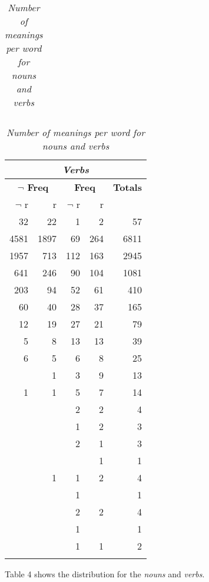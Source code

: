 \begin{table}[htb]
\begin{tabular}{|r||r|r|r|r|r|}
\end{tabular}
\begin{tabular}{r|r|r|r|r|}\hline
 \multicolumn{5}{c|}{\em Verbs}\\ \hline
 \multicolumn{2}{c|}{\bf $\neg$ Freq} &\multicolumn{2}{c|}{\bf Freq}
     & {\bf Totals}\\ \cline{1-4}
 $\neg$ r&      r&$\neg$ r&      r& \\ \hline\hline
   32&     22&      1&      2 &   57\\ \hline
 4581&   1897&     69&    264 & 6811\\ \hline
 1957&    713&    112&    163 & 2945\\ \hline
  641&    246&     90&    104 & 1081\\ \hline
  203&     94&     52&     61 &  410\\ \hline
   60&     40&     28&     37 &  165\\ \hline
   12&     19&     27&     21 &   79\\ \hline
    5&      8&     13&     13 &   39\\ \hline
    6&      5&      6&      8 &   25\\ \hline
     &      1&      3&      9 &   13\\ \hline
    1&      1&      5&      7 &   14\\ \hline
     &       &      2&      2 &    4\\ \hline
     &       &      1&      2 &    3\\ \hline
     &       &      2&      1 &    3\\ \hline
     &       &       &      1 &    1\\ \hline
     &      1&      1&      2 &    4\\ \hline
     &       &      1&        &    1\\ \hline
     &       &      2&      2 &    4\\ \hline
     &       &      1&        &    1\\ \hline
     &       &      1&      1 &    2\\ \hline
     &       &       &        &     \\ \hline
\end{tabular}
\caption{{\em Number of meanings per word for nouns and verbs}} 
\end{table}

Table 4 shows the distribution for the {\em nouns} and {\em verbs}.

